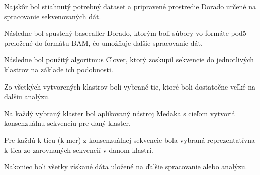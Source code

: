 
Najskôr bol stiahnutý potrebný dataset a pripravené prostredie Dorado určené na spracovanie sekvenovaných dát.





Následne bol spustený basecaller Dorado, ktorým boli súbory vo formáte pod5 preložené do formátu BAM, čo umožňuje ďalšie spracovanie dát.


Následne bol použitý algoritmus Clover, ktorý zoskupil sekvencie do jednotlivých klastrov na základe ich podobnosti.


Zo všetkých vytvorených klastrov boli vybrané tie, ktoré boli dostatočne veľké na ďalšiu analýzu.


Na každý vybraný klaster bol aplikovaný nástroj Medaka s cieľom vytvoriť konsenzuálnu sekvenciu pre daný klaster.


Pre každú k-ticu (k-mer) z konsenzuálnej sekvencie bola vybraná reprezentatívna k-tica zo zarovnaných sekvencií v danom klastri.


Nakoniec boli všetky získané dáta uložené na ďalšie spracovanie alebo analýzu.
